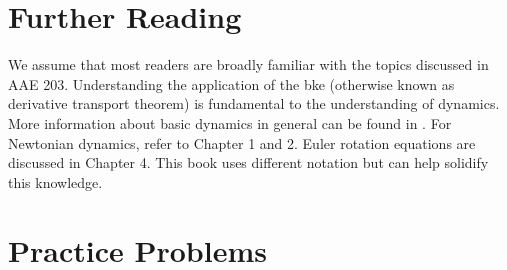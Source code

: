 \documentclass[12pt]{report}
\begin{document}
\section{Further Reading}

We assume that most readers are broadly familiar with the topics discussed in AAE 203. Understanding the application of the \gls{bke} (otherwise known as derivative transport theorem) is fundamental to the understanding of dynamics. More information about basic dynamics in general can be found in \cite{kasdin_engineering_2011}. For Newtonian dynamics, refer to Chapter 1 and 2. Euler rotation equations are discussed in Chapter 4. This book uses different notation but can help solidify this knowledge.

\section{Practice Problems}
\end{document}
